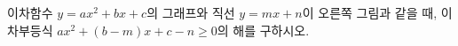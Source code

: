 \noindent\begin{minipage}[t]{0.58\linewidth}\vspace{0pt}\raggedright 이차함수 $y=ax^2+bx+c$의 그래프와 직선 $y=mx+n$이 오른쪽 그림과 같을 때, 이차부등식 $ax^2+(b-m)x+c-n\ge 0$의 해를 구하시오. \end{minipage}\hfill\begin{minipage}[t]{0.4\linewidth}\vspace{0pt}\centering \resizebox{\ifdim\width>\linewidth\linewidth\else\width\fi}{!}{}\end{minipage}\par
